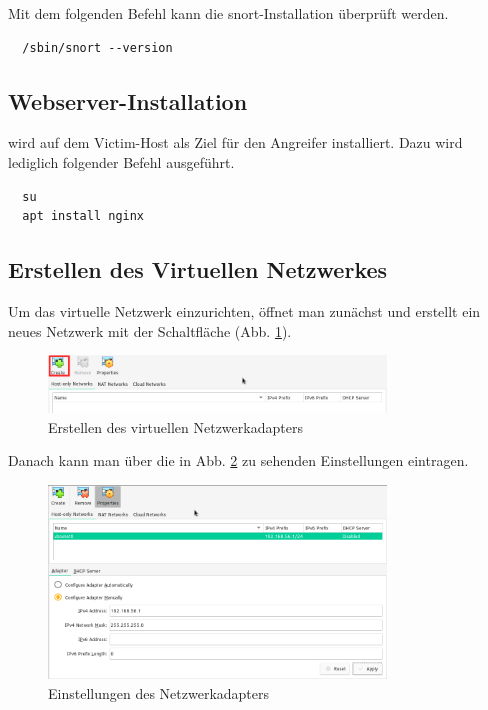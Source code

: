 Mit dem folgenden Befehl kann die snort-Installation überprüft werden.
\begin{verbatim}
  /sbin/snort --version
\end{verbatim}

\subsection{Webserver-Installation}
 wird auf dem Victim-Host als Ziel für den Angreifer installiert. Dazu wird lediglich folgender Befehl ausgeführt.
\begin{verbatim}
  su
  apt install nginx
\end{verbatim}

\subsection{Erstellen des Virtuellen Netzwerkes}
Um das virtuelle Netzwerk einzurichten, öffnet man zunächst  und erstellt ein neues Netzwerk mit der Schaltfläche  (Abb. \ref{fig:network-host-manager}).

\begin{figure}[H]
  \centering
  \includegraphics[width=0.8\textwidth]{graphics/setup/network-create.png}
  \caption{Erstellen des virtuellen Netzwerkadapters}\label{fig:network-host-manager}
\end{figure}

Danach kann man über  die in Abb. \ref{fig:network-hm-properties} zu sehenden Einstellungen eintragen.

\begin{figure}[H]
  \centering
  \includegraphics[width=0.8\textwidth]{graphics/setup/network-adapter.png}
  \caption{Einstellungen des Netzwerkadapters}\label{fig:network-hm-properties}
\end{figure}

